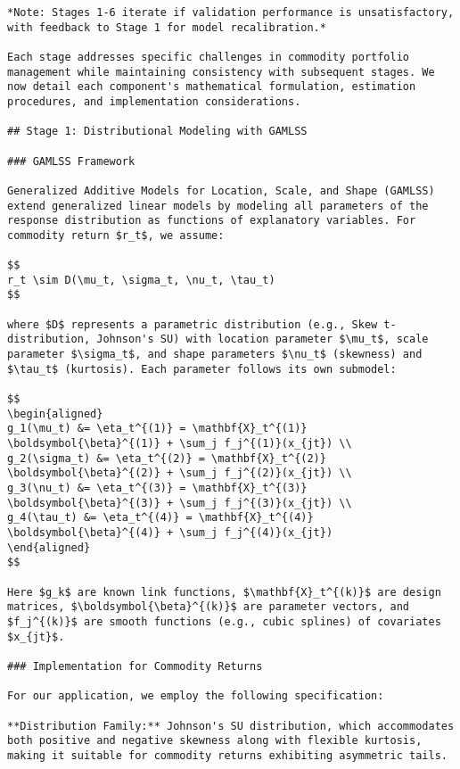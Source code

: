 \documentclass[
  10pt,
  a4paper,
]{article}
\begin{document}
\begin{tcolorbox}
\begin{verbatim}
*Note: Stages 1-6 iterate if validation performance is unsatisfactory, with feedback to Stage 1 for model recalibration.*

Each stage addresses specific challenges in commodity portfolio management while maintaining consistency with subsequent stages. We now detail each component's mathematical formulation, estimation procedures, and implementation considerations.

## Stage 1: Distributional Modeling with GAMLSS

### GAMLSS Framework

Generalized Additive Models for Location, Scale, and Shape (GAMLSS) extend generalized linear models by modeling all parameters of the response distribution as functions of explanatory variables. For commodity return $r_t$, we assume:

$$
r_t \sim D(\mu_t, \sigma_t, \nu_t, \tau_t)
$$

where $D$ represents a parametric distribution (e.g., Skew t-distribution, Johnson's SU) with location parameter $\mu_t$, scale parameter $\sigma_t$, and shape parameters $\nu_t$ (skewness) and $\tau_t$ (kurtosis). Each parameter follows its own submodel:

$$
\begin{aligned}
g_1(\mu_t) &= \eta_t^{(1)} = \mathbf{X}_t^{(1)} \boldsymbol{\beta}^{(1)} + \sum_j f_j^{(1)}(x_{jt}) \\
g_2(\sigma_t) &= \eta_t^{(2)} = \mathbf{X}_t^{(2)} \boldsymbol{\beta}^{(2)} + \sum_j f_j^{(2)}(x_{jt}) \\
g_3(\nu_t) &= \eta_t^{(3)} = \mathbf{X}_t^{(3)} \boldsymbol{\beta}^{(3)} + \sum_j f_j^{(3)}(x_{jt}) \\
g_4(\tau_t) &= \eta_t^{(4)} = \mathbf{X}_t^{(4)} \boldsymbol{\beta}^{(4)} + \sum_j f_j^{(4)}(x_{jt})
\end{aligned}
$$

Here $g_k$ are known link functions, $\mathbf{X}_t^{(k)}$ are design matrices, $\boldsymbol{\beta}^{(k)}$ are parameter vectors, and $f_j^{(k)}$ are smooth functions (e.g., cubic splines) of covariates $x_{jt}$.

### Implementation for Commodity Returns

For our application, we employ the following specification:

**Distribution Family:** Johnson's SU distribution, which accommodates both positive and negative skewness along with flexible kurtosis, making it suitable for commodity returns exhibiting asymmetric tails.


\end{verbatim}
\end{tcolorbox}
\end{document}

